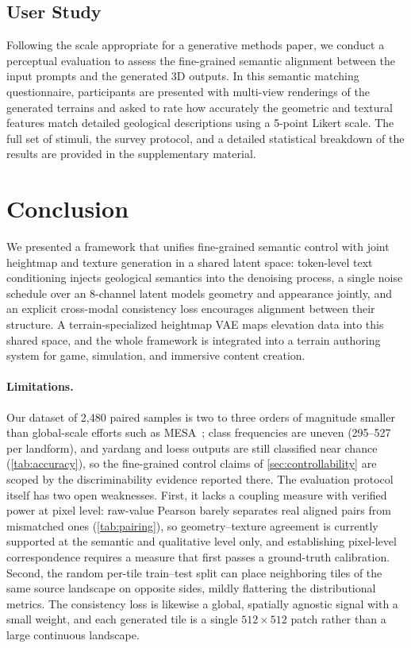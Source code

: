 \documentclass[review]{vgtc}                 %
\begin{document}
\subsection{User Study}
\label{sec:userstudy}

Following the scale appropriate for a generative methods paper, we conduct a perceptual evaluation to assess the fine-grained semantic alignment between the input prompts and the generated 3D outputs. In this semantic matching questionnaire, participants are presented with multi-view renderings of the generated terrains and asked to rate how accurately the geometric and textural features match detailed geological descriptions using a 5-point Likert scale. The full set of stimuli, the survey protocol, and a detailed statistical breakdown of the results are provided in the supplementary material.






\section{Conclusion}
\label{sec:conclusion}

We presented a framework that unifies fine-grained semantic control with joint heightmap and texture generation in a shared latent space: token-level text conditioning injects geological semantics into the denoising process, a single noise schedule over an 8-channel latent models geometry and appearance jointly, and an explicit cross-modal consistency loss encourages alignment between their structure.
A terrain-specialized heightmap VAE maps elevation data into this shared space, and the whole framework is integrated into a terrain authoring system for game, simulation, and immersive content creation.

\paragraph{Limitations.}
Our dataset of 2{,}480 paired samples is two to three orders of magnitude smaller than global-scale efforts such as MESA~\cite{MESA:2025}; class frequencies are uneven (295--527 per landform), and yardang and loess outputs are still classified near chance (\cref{tab:accuracy}), so the fine-grained control claims of \cref{sec:controllability} are scoped by the discriminability evidence reported there.
The evaluation protocol itself has two open weaknesses. First, it lacks a coupling measure with verified power at pixel level: raw-value Pearson barely separates real aligned pairs from mismatched ones (\cref{tab:pairing}), so geometry--texture agreement is currently supported at the semantic and qualitative level only, and establishing pixel-level correspondence requires a measure that first passes a ground-truth calibration. Second, the random per-tile train--test split can place neighboring tiles of the same source landscape on opposite sides, mildly flattering the distributional metrics. The consistency loss is likewise a global, spatially agnostic signal with a small weight, and each generated tile is a single $512 \times 512$ patch rather than a large continuous landscape.
\end{document}
